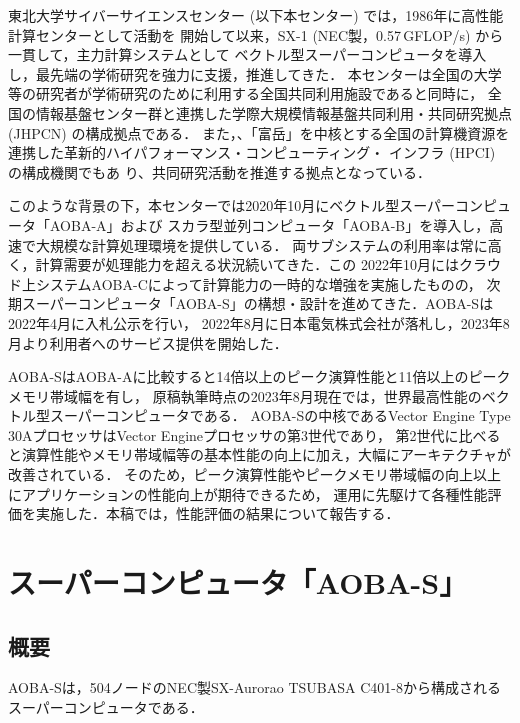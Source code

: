 ﻿\documentclass[submit,techrep,noauthor]{ipsj}
\begin{document}
東北大学サイバーサイエンスセンター (以下本センター) では，1986年に高性能計算センターとして活動を
開始して以来，SX-1 (NEC製，0.57\,GFLOP/s) から一貫して，主力計算システムとして
ベクトル型スーパーコンピュータを導入し，最先端の学術研究を強力に支援，推進してきた．
本センターは全国の大学等の研究者が学術研究のために利用する全国共同利用施設であると同時に，
全国の情報基盤センター群と連携した学際大規模情報基盤共同利用・共同研究拠点 (JHPCN) の構成拠点である．
また，、「富岳」を中核とする全国の計算機資源を連携した革新的ハイパフォーマンス・コンピューティング・
インフラ (HPCI) の構成機関でもあ り、共同研究活動を推進する拠点となっている．

このような背景の下，本センターでは2020年10月にベクトル型スーパーコンピュータ「AOBA-A」および
スカラ型並列コンピュータ「AOBA-B」を導入し，高速で大規模な計算処理環境を提供している．
両サブシステムの利用率は常に高く，計算需要が処理能力を超える状況続いてきた．この
2022年10月にはクラウド上システムAOBA-Cによって計算能力の一時的な増強を実施したものの，
次期スーパーコンピュータ「AOBA-S」の構想・設計を進めてきた．AOBA-Sは2022年4月に入札公示を行い，
2022年8月に日本電気株式会社が落札し，2023年8月より利用者へのサービス提供を開始した．

AOBA-SはAOBA-Aに比較すると14倍以上のピーク演算性能と11倍以上のピークメモリ帯域幅を有し，
原稿執筆時点の2023年8月現在では，世界最高性能のベクトル型スーパーコンピュータである．
AOBA-Sの中核であるVector Engine Type 30AプロセッサはVector Engineプロセッサの第3世代であり，
第2世代に比べると演算性能やメモリ帯域幅等の基本性能の向上に加え，大幅にアーキテクチャが改善されている．
そのため，ピーク演算性能やピークメモリ帯域幅の向上以上にアプリケーションの性能向上が期待できるため，
運用に先駆けて各種性能評価を実施した．本稿では，性能評価の結果について報告する．

\section{スーパーコンピュータ「AOBA-S」}

\subsection{概要}

AOBA-Sは，504ノードのNEC製SX-Aurorao TSUBASA C401-8から構成されるスーパーコンピュータである．
\end{document}
